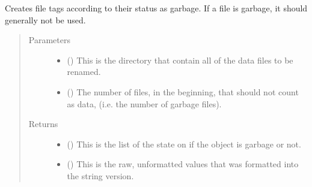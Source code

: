 \documentclass[letterpaper,10pt,english]{sphinxmanual}
\begin{document}
\begin{fulllineitems}
\label{\detokenize{docstrings/ifa_smeargle.reformat.renaming:ifa_smeargle.reformat.renaming.rename_garbage}}
Creates file tags according to their status as garbage. If
a file is garbage, it should generally not be used.
\begin{quote}\begin{description}
\item[{Parameters}] \leavevmode\begin{itemize}
\item {} 
 () \textendash{} This is the directory that contain all of the data files to
be renamed.

\item {} 
 (\sphinxstyleliteralemphasis{\sphinxupquote{ (}}\sphinxstyleliteralemphasis{\sphinxupquote{)}}) \textendash{} The number of files, in the beginning, that should not count
as data, (i.e. the number of garbage files).

\end{itemize}

\item[{Returns}] \leavevmode
\begin{itemize}
\item {} 
 () \textendash{} This is the list of the state on if the object is garbage
or not.

\item {} 
 () \textendash{} This is the raw, unformatted values that was formatted
into the string version.

\end{itemize}


\end{description}\end{quote}

\end{fulllineitems}

\end{document}
